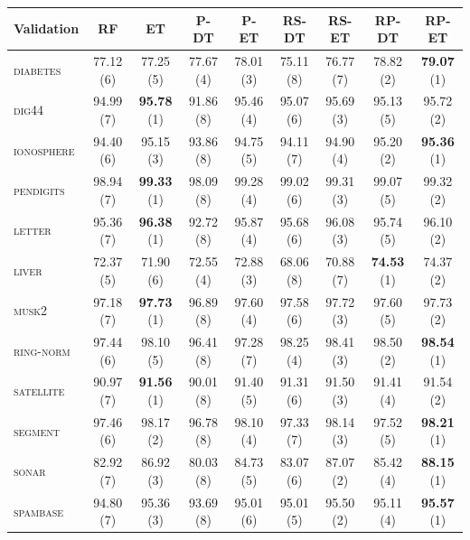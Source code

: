 \begin{table}
    \centering
    \footnotesize
    \hspace{-3.2cm}
\begin{tabular}{|l|cccccccc|}
\hline
\textbf{Validation} & RF & ET & P-DT & P-ET & RS-DT & RS-ET & RP-DT & RP-ET \\
\hline
\hline
    \textsc{diabetes  }  & 77.12 (6)    & 77.25 (5)    & 77.67 (4)    & 78.01 (3)    & 75.11 (8)    & 76.77 (7)    & 78.82 (2)   &  \textbf{79.07} (1) \\
    \textsc{dig44     }  & 94.99 (7)    & \textbf{95.78} (1)    & 91.86 (8)    & 95.46 (4)    & 95.07 (6)    & 95.69 (3)    & 95.13 (5)   &  95.72 (2) \\
    \textsc{ionosphere}  & 94.40 (6)    & 95.15 (3)    & 93.86 (8)    & 94.75 (5)    & 94.11 (7)    & 94.90 (4)    & 95.20 (2)   &  \textbf{95.36} (1) \\
    \textsc{pendigits }  & 98.94 (7)    & \textbf{99.33} (1)    & 98.09 (8)    & 99.28 (4)    & 99.02 (6)    & 99.31 (3)    & 99.07 (5)   &  99.32 (2) \\
    \textsc{letter    }  & 95.36 (7)    & \textbf{96.38} (1)    & 92.72 (8)    & 95.87 (4)    & 95.68 (6)    & 96.08 (3)    & 95.74 (5)   &  96.10 (2) \\
    \textsc{liver     }  & 72.37 (5)    & 71.90 (6)    & 72.55 (4)    & 72.88 (3)    & 68.06 (8)    & 70.88 (7)    & \textbf{74.53} (1)   &  74.37 (2) \\
    \textsc{musk2     }  & 97.18 (7)    & \textbf{97.73} (1)    & 96.89 (8)    & 97.60 (4)    & 97.58 (6)    & 97.72 (3)    & 97.60 (5)   &  97.73 (2) \\
    \textsc{ring-norm }  & 97.44 (6)    & 98.10 (5)    & 96.41 (8)    & 97.28 (7)    & 98.25 (4)    & 98.41 (3)    & 98.50 (2)   &  \textbf{98.54} (1) \\
    \textsc{satellite }  & 90.97 (7)    & \textbf{91.56} (1)    & 90.01 (8)    & 91.40 (5)    & 91.31 (6)    & 91.50 (3)    & 91.41 (4)   &  91.54 (2) \\
    \textsc{segment   }  & 97.46 (6)    & 98.17 (2)    & 96.78 (8)    & 98.10 (4)    & 97.33 (7)    & 98.14 (3)    & 97.52 (5)   &  \textbf{98.21} (1) \\
    \textsc{sonar     }  & 82.92 (7)    & 86.92 (3)    & 80.03 (8)    & 84.73 (5)    & 83.07 (6)    & 87.07 (2)    & 85.42 (4)   &  \textbf{88.15} (1) \\
    \textsc{spambase  }  & 94.80 (7)    & 95.36 (3)    & 93.69 (8)    & 95.01 (6)    & 95.01 (5)    & 95.50 (2)    & 95.11 (4)   &  \textbf{95.57} (1) \\

\end{tabular}
\end{table}
